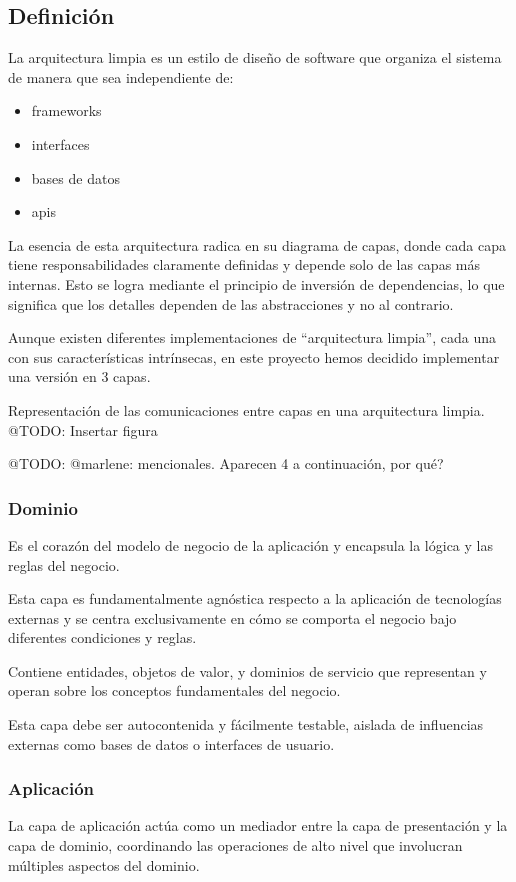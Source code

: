 \subsection{Definición}
La arquitectura limpia es un estilo de diseño de software que organiza el sistema de manera que sea independiente de:

\begin{itemize}
    \item frameworks
    \item interfaces
    \item bases de datos
    \item apis
\end{itemize}

La esencia de esta arquitectura radica en su diagrama de capas, donde cada capa tiene responsabilidades claramente
definidas y depende solo de las capas más internas.
Esto se logra mediante el principio de inversión de dependencias, lo que significa que los detalles dependen de las
abstracciones y no al contrario.

Aunque existen diferentes implementaciones de ``arquitectura limpia'', cada una con sus características intrínsecas, en
este proyecto hemos decidido implementar una versión en 3 capas.

Representación de las comunicaciones entre capas en una arquitectura limpia.
\colorbox{color_highlight}{@TODO: Insertar figura}

\colorbox{color_highlight}{@TODO: @marlene: mencionales. Aparecen 4 a continuación, por qué?}
\subsubsection*{Dominio}
Es el corazón del modelo de negocio de la aplicación y encapsula la lógica y las reglas del negocio.

Esta capa es fundamentalmente agnóstica respecto a la aplicación de tecnologías externas y se
centra exclusivamente en cómo se comporta el negocio bajo diferentes condiciones y reglas.

Contiene entidades, objetos de valor, y dominios de servicio que representan y operan sobre los
conceptos fundamentales del negocio.

Esta capa debe ser autocontenida y fácilmente testable, aislada de influencias externas como bases de
datos o interfaces de usuario.

\subsubsection*{Aplicación}
La capa de aplicación actúa como un mediador entre la capa de presentación y la capa de dominio, coordinando
las operaciones de alto nivel que involucran múltiples aspectos del dominio.

